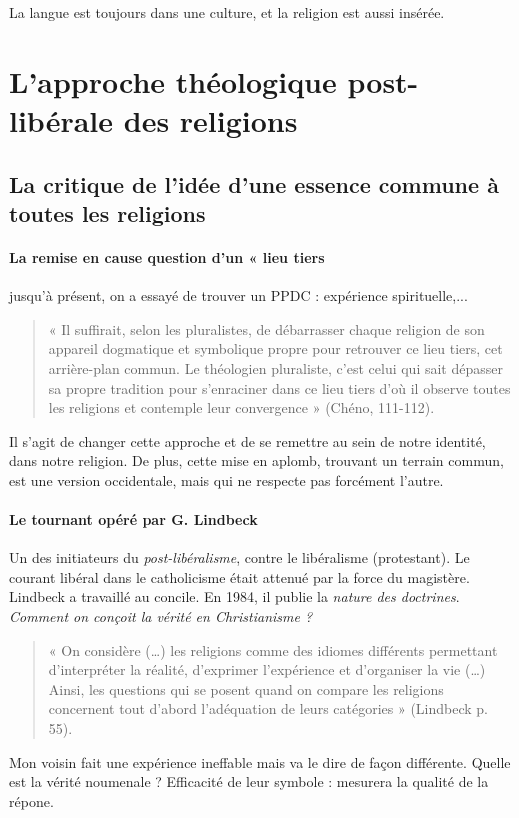 La langue est toujours dans une culture, et la religion est aussi insérée.

\section{L’approche théologique post-libérale des religions }

\subsection{La critique de l’idée d’une essence commune à toutes les religions}
\paragraph{La remise en cause question d’un « lieu tiers } jusqu'à présent, on a essayé de trouver un PPDC : expérience spirituelle,...

\begin{quote}
    « Il suffirait, selon les pluralistes, de débarrasser chaque religion de son appareil dogmatique et symbolique propre pour retrouver ce lieu tiers, cet arrière-plan commun. Le théologien pluraliste, c’est celui qui sait dépasser sa propre tradition pour s’enraciner dans ce lieu tiers d’où il observe toutes les religions et contemple leur convergence » (Chéno, 111-112). 
\end{quote}

Il s'agit de changer cette approche et de se remettre au sein de notre identité, dans notre religion.
De plus, cette mise en aplomb, trouvant un terrain commun, est une version occidentale, mais qui ne respecte pas forcément l'autre.


\paragraph{Le tournant opéré par G. Lindbeck  } Un des initiateurs du \textit{post-libéralisme}, contre le libéralisme (protestant). Le courant libéral dans le catholicisme était attenué par la force du magistère.
Lindbeck a travaillé au concile.  En 1984, il publie la \textit{nature des doctrines}. \textit{Comment on conçoit la vérité en Christianisme ?}

 
 \begin{quote}
     « On considère (…) les religions comme des idiomes différents permettant d’interpréter la réalité, d’exprimer l’expérience et d’organiser la vie (…) Ainsi, les questions qui se posent quand on compare les religions concernent tout d’abord l’adéquation de leurs catégories » (Lindbeck p. 55). 
 \end{quote}
 Mon voisin fait une expérience ineffable mais va le dire de façon différente. Quelle est la vérité noumenale ? Efficacité de leur symbole : mesurera la qualité de la répone. 
